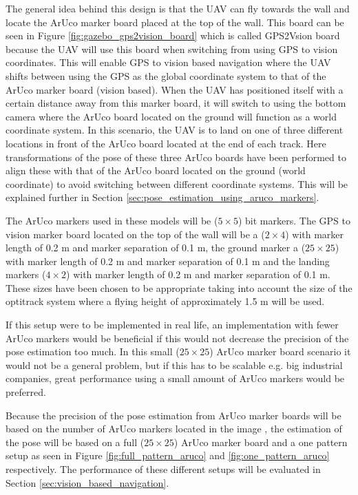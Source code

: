 \documentclass[../Head/report.tex]{subfiles}
\begin{document}
The general idea behind this design is that the UAV can fly towards the wall and locate the ArUco marker board placed at the top of the wall. This board can be seen in Figure \ref{fig:gazebo_gps2vision_board} which is called GPS2Vsion board because the UAV will use this board when switching from using GPS to vision coordinates. This will enable GPS to vision based navigation where the UAV shifts between using the GPS as the global coordinate system to that of the ArUco marker board (vision based). When the UAV has positioned itself with a certain distance away from this marker board, it will switch to using the bottom camera where the ArUco board located on the ground will function as a world coordinate system. In this scenario, the UAV is to land on one of three different locations in front of the ArUco board located at the end of each track. Here transformations of the pose of these three ArUco boards have been performed to align these with that of the ArUco board located on the ground (world coordinate) to avoid switching between different coordinate systems. This will be explained further in Section \ref{sec:pose_estimation_using_aruco_markers}. 

The ArUco markers used in these models will be ($5 \times 5$) bit markers. The GPS to vision marker board located on the top of the wall will be a ($2\times 4$) with marker length of 0.2 m and marker separation of 0.1 m, the ground marker a ($25\times25$) with marker length of 0.2 m and marker separation of 0.1 m and the landing markers ($4\times2$) with marker length of 0.2 m and marker separation of 0.1 m. These sizes have been chosen to be appropriate taking into account the size of the optitrack system where a flying height of approximately 1.5 m will be used.

If this setup were to be implemented in real life, an implementation with fewer ArUco markers would be beneficial if this would not decrease the precision of the pose estimation too much. In this small ($25\times25$) ArUco marker board scenario it would not be a general problem, but if this has to be scalable e.g. big industrial companies, great performance using a small amount of ArUco markers would be preferred.

Because the precision of the pose estimation from ArUco marker boards will be based on the number of ArUco markers located in the image \cite{DetectionOfArUcoBoards}, the estimation of the pose will be based on a full ($25\times25$) ArUco marker board and a one pattern setup as seen in Figure \ref{fig:full_pattern_aruco} and \ref{fig:one_pattern_aruco} respectively. The performance of these different setups will be evaluated in Section \ref{sec:vision_based_navigation}.  
\end{document}
